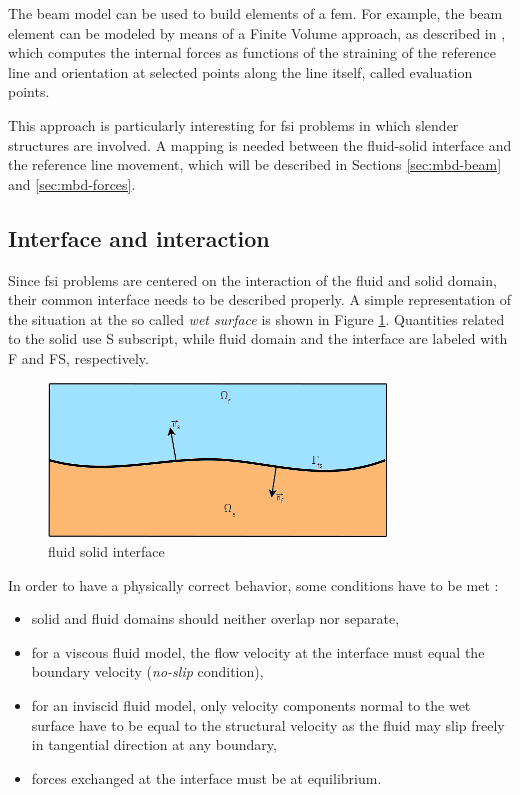 The beam model can be used to build elements of a \acrfull{fem}. For example, the beam element can be modeled by means of a Finite Volume approach, as described in \cite{ghiringhelli2000multibody}, which computes the internal forces as functions of the straining of the reference line and orientation at selected points along the line itself, called evaluation points.

This approach is particularly interesting for \acrshort{fsi} problems in which slender structures are involved. A mapping is needed between the fluid-solid interface and the reference line movement, which will be described in Sections \ref{sec:mbd-beam} and \ref{sec:mbd-forces}.


\subsection{Interface and interaction}
\label{sec:interface}

Since \acrshort{fsi} problems are centered on the interaction of the fluid and solid domain, their common interface needs to be described properly. A simple representation of the situation at the so called \textit{wet surface} is shown in Figure \ref{fig:interface}. Quantities related to the solid use S subscript, while fluid domain and the interface are labeled with F and FS, respectively. 

\begin{figure}[htbp!]
	\centering
	\includegraphics[width=0.8\textwidth]{images/interface}
	\caption{fluid solid interface}
	\label{fig:interface}
\end{figure}

In order to have a physically correct behavior, some conditions have to be met \cite{hou2012numerical}:

\begin{itemize}
	\item solid and fluid domains should neither overlap nor separate,
	\item for a viscous fluid model, the flow velocity at the interface must equal the boundary velocity (\textit{no-slip} condition),
	\item for an inviscid fluid model, only velocity components normal to the wet surface have to be equal to the structural 	velocity as the fluid may slip freely in tangential direction at any boundary,
	\item forces exchanged at the interface must be at equilibrium.
\end{itemize}

